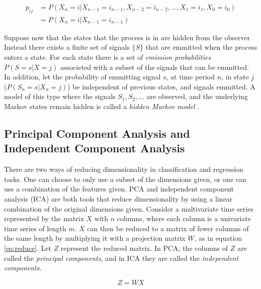 \begin{equation}
    \begin{split}
        p_{ij}  &= P(X_n = i | X_{n-1} = i_{n-1}, X_{n-2} = i_{n-2},..., X_{1} = i_{1}, X_{0} = i_{0}) \\
                &= P(X_n = i | X_{n-1} = i_{n-1})      
    \end{split}
    \label{eq:markov_property}
\end{equation}

Suppose now that the states that the process is in are hidden from the observer. 
Instead there exists a finite set of signals $\{S\}$ that are emmitted when the process enters a state. 
For each state there is a set of \textit{emission probabilities} $P(S = s | X = j)$ associeted with a subset of the signals that can be emmitted.
In addition, let the probability of emmitting signal $s$, at time period $n$, in state $j$ ($P(S_n = s | X_n = j)$) be independent of previous states, and signals emmitted. 
A model of this type where the signals $S_1, S_2, ...$ are observed, and the underlying Markov states remain hidden is called a \textit{hidden Markov model} \cite{stoch_pros}. 

\subsection{Principal Component Analysis and Independent Component Analysis}
There are two ways of reducing dimensionality in classification and regression tasks. 
One can choose to only use a subset of the dimensions given, or one can use a combination of the features given.
PCA and independent component analysis (ICA) are both tools that reduce dimensionality by using a linear combination of the original dimensions given.
Consider a multivariate time series represented by the matrix $X$ with $n$ columns, where each column is a univariate time series of length $m$.
$X$ can then be reduced to a matrix of fewer columns of the same length by multiplying it with a projection matrix $W$, as in equation \ref{eq:reduce}. 
Let $Z$ represent the reduced matrix.
In PCA, the columns of $Z$ are called the \textit{principal components}, and in ICA they are called the \textit{independent components}. 

\begin{equation}
    Z = W X
    \label{eq:reduce}
\end{equation}

